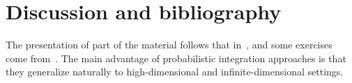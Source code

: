 \section{Discussion and bibliography}
The presentation of part of the material follows that in~\cite{Legat},
and some exercises come from~\cite[Chapter 9]{MR2265914}.
The main advantage of probabilistic integration approaches is that
they generalize naturally to high-dimensional and infinite-dimensional settings.
